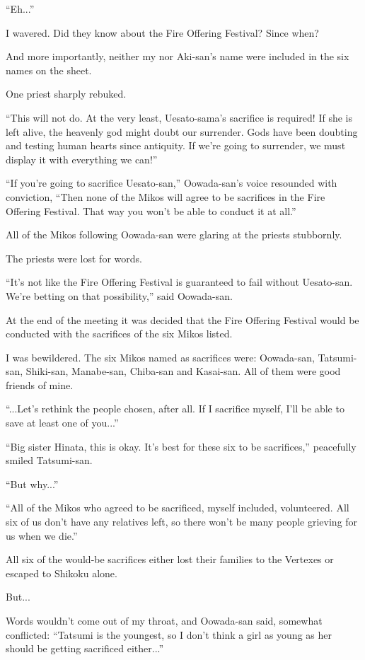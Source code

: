 ``Eh...''

I wavered. Did they know about the Fire Offering Festival? Since when?

And more importantly, neither my nor Aki-san's name were included in the six names on the sheet.

One priest sharply rebuked.

``This will not do. At the very least, Uesato-sama's sacrifice is required! If she is left alive, the heavenly god might doubt our surrender. Gods have been doubting and testing human hearts since antiquity. If we're going to surrender, we must display it with everything we can!''

``If you're going to sacrifice Uesato-san,'' Oowada-san's voice resounded with conviction, ``Then none of the Mikos will agree to be sacrifices in the Fire Offering Festival. That way you won't be able to conduct it at all.''

All of the Mikos following Oowada-san were glaring at the priests stubbornly.

The priests were lost for words.

``It's not like the Fire Offering Festival is guaranteed to fail without Uesato-san. We're betting on that possibility,'' said Oowada-san.

At the end of the meeting it was decided that the Fire Offering Festival would be conducted with the sacrifices of the six Mikos listed.

I was bewildered. The six Mikos named as sacrifices were: Oowada-san, Tatsumi-san, Shiki-san, Manabe-san, Chiba-san and Kasai-san. All of them were good friends of mine.

``...Let's rethink the people chosen, after all. If I sacrifice myself, I'll be able to save at least one of you...''

``Big sister Hinata, this is okay. It's best for these six to be sacrifices,'' peacefully smiled Tatsumi-san.

``But why...''

``All of the Mikos who agreed to be sacrificed, myself included, volunteered. All six of us don't have any relatives left, so there won't be many people grieving for us when we die.''

All six of the would-be sacrifices either lost their families to the Vertexes or escaped to Shikoku alone.

But...

Words wouldn't come out of my throat, and Oowada-san said, somewhat conflicted: ``Tatsumi is the youngest, so I don't think a girl as young as her should be getting sacrificed either...''

